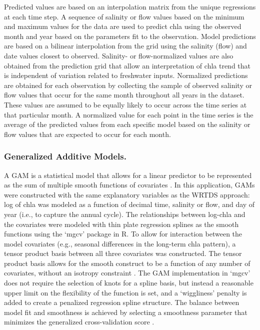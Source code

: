 \documentclass[letterpaper,12pt,oneside]{article}\usepackage[]{graphicx}\usepackage[]{color}
\begin{document}
Predicted values are based on an interpolation matrix from the unique regressions at each time step. A sequence of salinity or flow values based on the minimum and maximum values for the data are used to predict \ac{chla} using the observed month and year based on the parameters fit to the observation. Model predictions are based on a bilinear interpolation from the grid using the salinity (flow) and date values closest to observed. Salinity- or flow-normalized values are also obtained from the prediction grid that allow an interpretation of \ac{chla} trend that is independent of variation related to freshwater inputs. Normalized predictions are obtained for each observation by collecting the sample of observed salinity or flow values that occur for the same month throughout all years in the dataset.  These values are assumed to be equally likely to occur across the time series at that particular month. A normalized value for each point in the time series is the average of the predicted values from each specific model based on the salinity or flow values that are expected to occur for each month.

\subsubsection*{\hspace*{0.25in}Generalized Additive Models.}

A \ac{GAM} is a statistical model that allows for a linear predictor to be represented as the sum of multiple smooth functions of covariates \citep{Hastie90}. In this application, \acp{GAM} were constructed with the same explanatory variables as the \ac{WRTDS} approach: log of \ac{chla} was modeled as a function of decimal time, salinity or flow, and day of year (i.e., to capture the annual cycle). The relationships between log-\ac{chla} and the covariates were modeled with thin plate regression splines \citep{Wood06} as the smooth functions using the `mgcv' package in R. To allow for interaction between the model covariates (e.g., seasonal differences in the long-term \ac{chla} pattern), a tensor product basis between all three covariates was constructed. The tensor product basis allows for the smooth construct to be a function of any number of covariates, without an isotropy constraint \citep{Wood06b}. The \ac{GAM} implementation in `mgcv' does not require the selection of knots for a spline basis, but instead a reasonable upper limit on the flexibility of the function is set, and a `wiggliness' penalty is added to create a penalized regression spline structure. The balance between model fit and smoothness is achieved by selecting a smoothness parameter that minimizes the generalized cross-validation score \citep{Wood06}.
\end{document}
